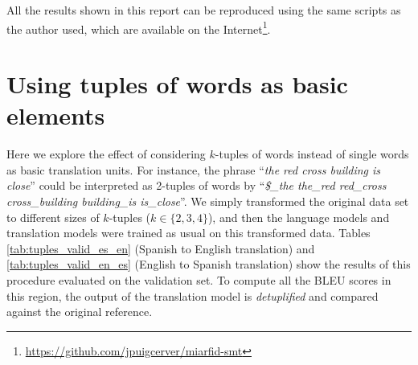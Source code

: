 \documentclass[10pt,a4paper]{article}
\begin{document}
All the results shown in this report can be reproduced using the same scripts as the author used, which are available on the Internet\footnote{\url{https://github.com/jpuigcerver/miarfid-smt}}.

\section{Using tuples of words as basic elements}\label{sec:tuples}
Here we explore the effect of considering $k$-tuples of words instead of single words as basic translation units. For instance, the phrase ``\emph{the red cross building is close}'' could be interpreted as 2-tuples of words by ``\emph{\$\_the the\_red red\_cross cross\_building building\_is is\_close}''. We simply transformed the original data set to different sizes of $k$-tuples ($k \in \{2,3,4\}$), and then the language models and translation models were trained as usual on this transformed data. Tables \ref{tab:tuples_valid_es_en} (Spanish to English translation) and \ref{tab:tuples_valid_en_es} (English to Spanish translation) show the results of this procedure evaluated on the validation set. To compute all the BLEU scores in this region, the output of the translation model is \emph{detuplified} and compared against the original reference.\\
\end{document}
